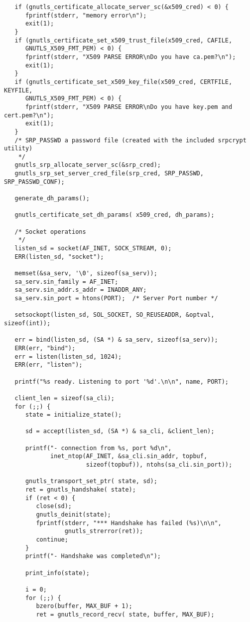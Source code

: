 \begin{verbatim}
   if (gnutls_certificate_allocate_server_sc(&x509_cred) < 0) {
      fprintf(stderr, "memory error\n");
      exit(1);
   }
   if (gnutls_certificate_set_x509_trust_file(x509_cred, CAFILE, 
      GNUTLS_X509_FMT_PEM) < 0) {
      fprintf(stderr, "X509 PARSE ERROR\nDo you have ca.pem?\n");
      exit(1);
   }
   if (gnutls_certificate_set_x509_key_file(x509_cred, CERTFILE, KEYFILE, 
      GNUTLS_X509_FMT_PEM) < 0) {
      fprintf(stderr, "X509 PARSE ERROR\nDo you have key.pem and cert.pem?\n");
      exit(1);
   }
   /* SRP_PASSWD a password file (created with the included srpcrypt utility) 
    */
   gnutls_srp_allocate_server_sc(&srp_cred);
   gnutls_srp_set_server_cred_file(srp_cred, SRP_PASSWD, SRP_PASSWD_CONF);

   generate_dh_params();
   
   gnutls_certificate_set_dh_params( x509_cred, dh_params);

   /* Socket operations
    */
   listen_sd = socket(AF_INET, SOCK_STREAM, 0);
   ERR(listen_sd, "socket");

   memset(&sa_serv, '\0', sizeof(sa_serv));
   sa_serv.sin_family = AF_INET;
   sa_serv.sin_addr.s_addr = INADDR_ANY;
   sa_serv.sin_port = htons(PORT);  /* Server Port number */

   setsockopt(listen_sd, SOL_SOCKET, SO_REUSEADDR, &optval, sizeof(int));

   err = bind(listen_sd, (SA *) & sa_serv, sizeof(sa_serv));
   ERR(err, "bind");
   err = listen(listen_sd, 1024);
   ERR(err, "listen");

   printf("%s ready. Listening to port '%d'.\n\n", name, PORT);

   client_len = sizeof(sa_cli);
   for (;;) {
      state = initialize_state();

      sd = accept(listen_sd, (SA *) & sa_cli, &client_len);

      printf("- connection from %s, port %d\n",
             inet_ntop(AF_INET, &sa_cli.sin_addr, topbuf,
                       sizeof(topbuf)), ntohs(sa_cli.sin_port));

      gnutls_transport_set_ptr( state, sd);
      ret = gnutls_handshake( state);
      if (ret < 0) {
         close(sd);
         gnutls_deinit(state);
         fprintf(stderr, "*** Handshake has failed (%s)\n\n",
                 gnutls_strerror(ret));
         continue;
      }
      printf("- Handshake was completed\n");

      print_info(state);

      i = 0;
      for (;;) {
         bzero(buffer, MAX_BUF + 1);
         ret = gnutls_record_recv( state, buffer, MAX_BUF);


\end{verbatim}
